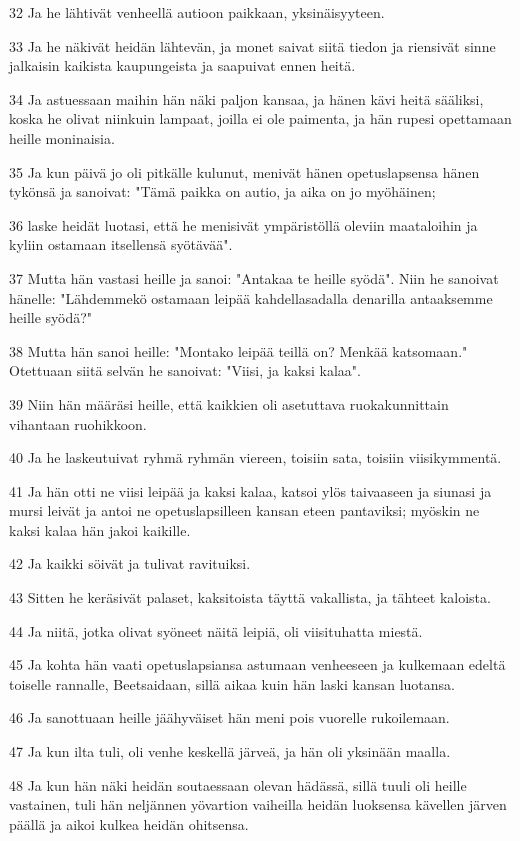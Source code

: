 \par 32 Ja he lähtivät venheellä autioon paikkaan, yksinäisyyteen.
\par 33 Ja he näkivät heidän lähtevän, ja monet saivat siitä tiedon ja riensivät sinne jalkaisin kaikista kaupungeista ja saapuivat ennen heitä.
\par 34 Ja astuessaan maihin hän näki paljon kansaa, ja hänen kävi heitä sääliksi, koska he olivat niinkuin lampaat, joilla ei ole paimenta, ja hän rupesi opettamaan heille moninaisia.
\par 35 Ja kun päivä jo oli pitkälle kulunut, menivät hänen opetuslapsensa hänen tykönsä ja sanoivat: "Tämä paikka on autio, ja aika on jo myöhäinen;
\par 36 laske heidät luotasi, että he menisivät ympäristöllä oleviin maataloihin ja kyliin ostamaan itsellensä syötävää".
\par 37 Mutta hän vastasi heille ja sanoi: "Antakaa te heille syödä". Niin he sanoivat hänelle: "Lähdemmekö ostamaan leipää kahdellasadalla denarilla antaaksemme heille syödä?"
\par 38 Mutta hän sanoi heille: "Montako leipää teillä on? Menkää katsomaan." Otettuaan siitä selvän he sanoivat: "Viisi, ja kaksi kalaa".
\par 39 Niin hän määräsi heille, että kaikkien oli asetuttava ruokakunnittain vihantaan ruohikkoon.
\par 40 Ja he laskeutuivat ryhmä ryhmän viereen, toisiin sata, toisiin viisikymmentä.
\par 41 Ja hän otti ne viisi leipää ja kaksi kalaa, katsoi ylös taivaaseen ja siunasi ja mursi leivät ja antoi ne opetuslapsilleen kansan eteen pantaviksi; myöskin ne kaksi kalaa hän jakoi kaikille.
\par 42 Ja kaikki söivät ja tulivat ravituiksi.
\par 43 Sitten he keräsivät palaset, kaksitoista täyttä vakallista, ja tähteet kaloista.
\par 44 Ja niitä, jotka olivat syöneet näitä leipiä, oli viisituhatta miestä.
\par 45 Ja kohta hän vaati opetuslapsiansa astumaan venheeseen ja kulkemaan edeltä toiselle rannalle, Beetsaidaan, sillä aikaa kuin hän laski kansan luotansa.
\par 46 Ja sanottuaan heille jäähyväiset hän meni pois vuorelle rukoilemaan.
\par 47 Ja kun ilta tuli, oli venhe keskellä järveä, ja hän oli yksinään maalla.
\par 48 Ja kun hän näki heidän soutaessaan olevan hädässä, sillä tuuli oli heille vastainen, tuli hän neljännen yövartion vaiheilla heidän luoksensa kävellen järven päällä ja aikoi kulkea heidän ohitsensa.
